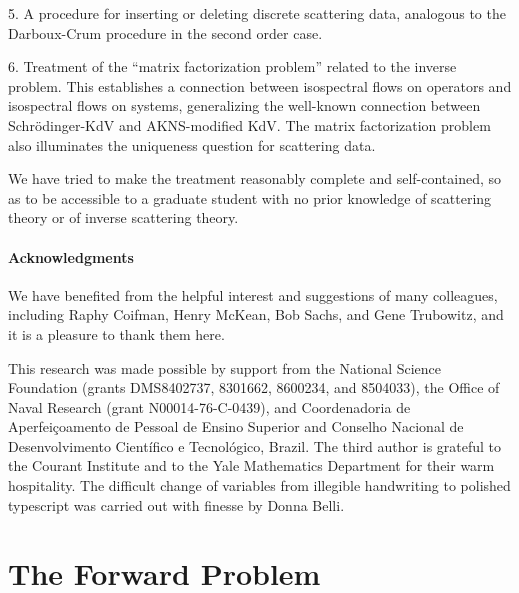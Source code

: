 \documentclass{surv-l}
\theoremstyle{plain}
\theoremstyle{definition}
\numberwithin{equation}{chapter}
\begin{document}
5. A procedure for inserting or deleting discrete scattering data, analogous to the Darboux-Crum procedure in the second order case.

6. Treatment of the ``matrix factorization problem'' related to the inverse problem. This establishes a connection between isospectral flows on operators and isospectral flows on systems, generalizing the well-known connection between Schr\"{o}dinger-KdV and AKNS-modified KdV. The matrix factorization problem also illuminates the uniqueness question for scattering data.

We have tried to make the treatment reasonably complete and self-contained, so as to be accessible to a graduate student with no prior knowledge of scattering theory or of inverse scattering theory.

\subsection*{Acknowledgments} We have benefited from the helpful interest and suggestions of many colleagues, including Raphy Coifman, Henry McKean, Bob Sachs, and Gene Trubowitz, and it is a pleasure to thank them here.

This research was made possible by support from the National Science Foundation (grants DMS8402737, 8301662, 8600234, and 8504033), the Office of Naval Research (grant N00014-76-C-0439), and Coordenadoria de Aperfei\c{c}oamento de Pessoal de Ensino Superior and Conselho Nacional de Desenvolvimento Cient\'{i}fico e Tecnol\'{o}gico, Brazil. The third author is grateful to the Courant Institute and to the Yale Mathematics Department for their warm hospitality. The difficult change of variables from illegible handwriting to polished typescript was carried out with finesse by Donna Belli.

\renewcommand{\thepart}{\Roman{part}}
\renewcommand{\thesection}{\arabic{section}}

\setcounter{part}{0}
\part{The Forward Problem}

\setcounter{section}{0}
\end{document}

